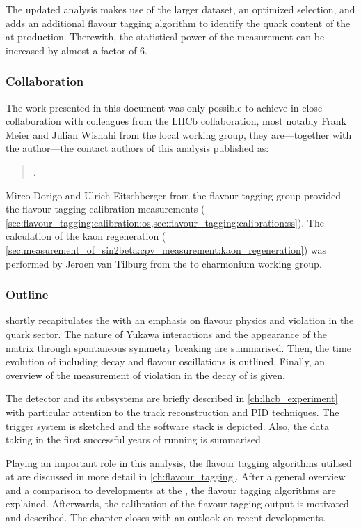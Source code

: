 The updated analysis makes use of the larger dataset, an optimized selection,
and adds an additional flavour tagging algorithm to identify the quark content
of the \Bmeson at production. Therewith, the statistical power of the
measurement can be increased by almost a factor of $\num{6}$.

\subsubsection*{Collaboration}
The work presented in this document was only possible to achieve in close
collaboration with colleagues from the \acs{LHCb} collaboration, most notably
Frank Meier and Julian Wishahi from the local working group, they are---together
with the author---the contact authors of this analysis published as:
%
\begin{quotation}
  .
\end{quotation}

Mirco Dorigo and Ulrich Eitschberger from the flavour tagging group provided the
flavour tagging calibration measurements (\cf
\cref{sec:flavour_tagging:calibration:os,sec:flavour_tagging:calibration:ss}).
The calculation of the kaon regeneration (\cf
\cref{sec:measurement_of_sin2beta:cpv_measurement:kaon_regeneration}) was
performed by Jeroen van Tilburg from the \B to charmonium working group.

\subsubsection*{Outline}

 shortly recapitulates the \SM with an emphasis on flavour
physics and \CP violation in the quark sector. The nature of Yukawa interactions
and the appearance of the \CKM matrix through spontaneous symmetry breaking are
summarised. Then, the time evolution of \Bmesons including decay and flavour
oscillations is outlined. Finally, an overview of the measurement of
\CP violation in the decay of \BdToJpsiKS is given.

The \LHCb detector and its subsystems are briefly described in
\cref{ch:lhcb_experiment} with particular attention to the track reconstruction
and \acl{PID} techniques. The \LHCb trigger system is sketched and the software
stack is depicted. Also, the data taking in the first successful years
of running is summarised.

Playing an important role in this analysis, the flavour tagging algorithms
utilised at \LHCb are discussed in more detail in \cref{ch:flavour_tagging}.
After a general overview and a comparison to developments at the \BFactories,
the flavour tagging algorithms are explained. Afterwards, the calibration of the
flavour tagging output is motivated and described. The chapter closes with an
outlook on recent developments.

